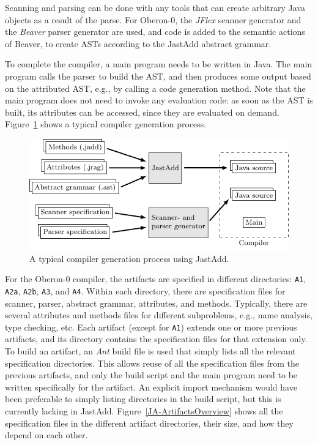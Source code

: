 Scanning and parsing can be done with any tools that can create arbitrary Java objects as a result of the parse. For Oberon-0, the \emph{JFlex} scanner generator and the \emph{Beaver} parser generator are used, and code is added to the semantic actions of Beaver, to create ASTs according to the JastAdd abstract grammar.

To complete the compiler, a main program needs to be written in Java. The main program calls the parser to build the AST, and then produces some output based on the attributed AST, e.g., by calling a code generation method. Note that the main program does not need to invoke any evaluation code: as soon as the AST is built, its attributes can be accessed, since they are evaluated on demand. Figure~\ref{JA-GenerationProcess} shows a typical compiler generation process.

\begin{figure}[h]
\begin{center}
\includegraphics{jastadd/generation-process.pdf}
\caption{A typical compiler generation process using JastAdd.}
\label{JA-GenerationProcess}
\end{center}
\end{figure}

For the Oberon-0 compiler, the artifacts are specified in different directories: \texttt{A1}, \texttt{A2a}, \texttt{A2b}, \texttt{A3}, and \texttt{A4}. Within each directory, there are specification files for scanner, parser, abstract grammar, attributes, and methods. Typically, there are several attributes and methods files for different subproblems, e.g., name analysis, type checking, etc. Each artifact (except for \texttt{A1}) extends one or more previous artifacts, and its directory contains the specification files for that extension only. To build an artifact, an \emph{Ant} build file is used that simply lists all the relevant specification directories. This allows reuse of all the specification files from the previous artifacts, and only the build script and the main program need to be written specifically for the artifact. An explicit import mechanism would have been preferable to simply listing directories in the build script, but this is currently lacking in JastAdd. Figure~\ref{JA-ArtifactsOverview} shows all the specification files in the different artifact directories, their size, and how they depend on each other.

